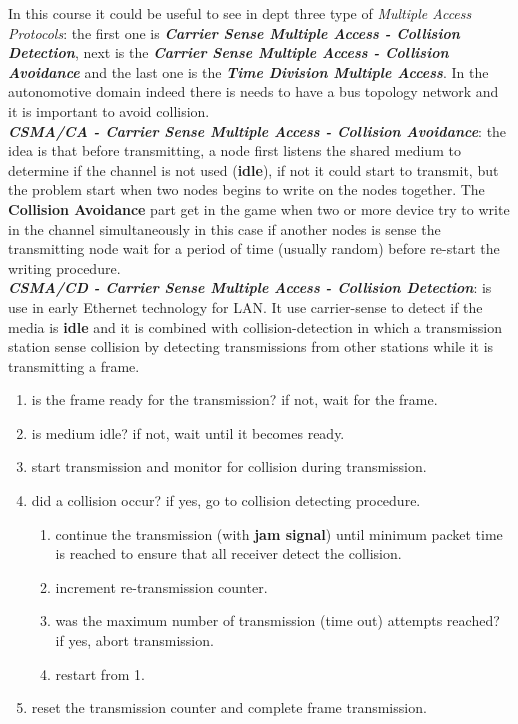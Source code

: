 In this course it could be useful to see in dept three type of \textit{Multiple Access Protocols}: the first one is \textbf{\textit{Carrier Sense Multiple Access - Collision Detection}}, next is the \textbf{\textit{Carrier Sense Multiple Access - Collision Avoidance}} and the last one is the \textbf{\textit{Time Division Multiple Access}}. In the autonomotive domain indeed there is needs to have a bus topology network and it is important to avoid collision. \\ \newline
\textbf{\textit{CSMA/CA - Carrier Sense Multiple Access - Collision Avoidance}}: the idea is that before transmitting, a node first listens the shared medium to determine if the channel is not used (\textbf{idle}), if not it could start to transmit, but the problem start when two nodes begins to write on the nodes together. The \textbf{Collision Avoidance} part get in the game when two or more device try to write in the channel simultaneously in this case if another nodes is sense the transmitting node wait for a period of time (usually random) before re-start the writing procedure. \\ \newline
\textbf{\textit{CSMA/CD - Carrier Sense Multiple Access - Collision Detection}}: is use in early Ethernet technology for LAN. It use carrier-sense to detect if the media is \textbf{idle} and it is combined with collision-detection in which a transmission station sense collision by detecting transmissions from other stations while it is transmitting a frame.
\begin{enumerate}[nosep]
    \item is the frame ready for the transmission? if not, wait for the frame.
    \item is medium idle? if not, wait until it becomes ready.
    \item start transmission and monitor for collision during transmission.
    \item did a collision occur? if yes, go to collision detecting procedure.
    \begin{enumerate}[nosep]
        \item continue the transmission (with \textbf{jam signal}) until minimum packet time is reached to ensure that all receiver detect the collision.
        \item increment re-transmission counter.
        \item was the maximum number of transmission (time out) attempts reached? if yes, abort transmission.
        \item restart from 1.
    \end{enumerate}
    \item reset the transmission counter and complete frame transmission.
\end{enumerate}

